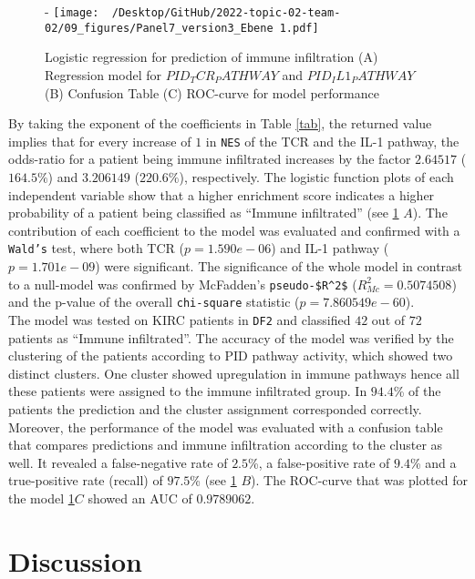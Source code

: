 \documentclass[
  parskip,
  oneside]{scrreprt}
\begin{document}
\begin{figure}[h]-
  \texttt{[image: ~/Desktop/GitHub/2022-topic-02-team-02/09\_figures/Panel7\_version3\_Ebene 1.pdf]}
  \caption{Logistic regression for prediction of immune infiltration (A) Regression model for $PID_TCR_PATHWAY$ and $PID_IL1_PATHWAY$ (B) Confusion Table (C) ROC-curve for model performance}
  \label{log}
\end{figure}

By taking the exponent of the coefficients in Table \cref{tab}, the
returned value implies that for every increase of \(1\) in \texttt{NES}
of the TCR and the IL-1 pathway, the odds-ratio for a patient being
immune infiltrated increases by the factor \(2.64517\) (\(164.5\%\)) and
\(3.206149\) (\(220.6\%\)), respectively. The logistic function plots of
each independent variable show that a higher enrichment score indicates
a higher probability of a patient being classified as ``Immune
infiltrated'' (see \cref{log} \(A\)). The contribution of each
coefficient to the model was evaluated and confirmed with a
\texttt{Wald’s} test, where both TCR (\(p= 1.590e-06\)) and IL-1 pathway
(\(p= 1.701e-09\)) were significant. The significance of the whole model
in contrast to a null-model was confirmed by McFadden's
\texttt{pseudo-\$R\^{}2\$} (\(R_{Mc}^2=0.5074508\)) and the p-value of
the overall \texttt{chi-square} statistic (\(p=7.860549e-60\)).\\
The model was tested on KIRC patients in \texttt{DF2} and classified
\(42\) out of \(72\) patients as ``Immune infiltrated''. The accuracy of
the model was verified by the clustering of the patients according to
PID pathway activity, which showed two distinct clusters. One cluster
showed upregulation in immune pathways hence all these patients were
assigned to the immune infiltrated group. In \(94.4\)\% of the patients
the prediction and the cluster assignment corresponded correctly.
Moreover, the performance of the model was evaluated with a confusion
table that compares predictions and immune infiltration according to the
cluster as well. It revealed a false-negative rate of \(2.5\)\%, a
false-positive rate of \(9.4\)\% and a true-positive rate (recall) of
\(97.5\)\% (see \cref{log} \(B\)). The ROC-curve that was plotted for
the model \cref{log}\(C\) showed an AUC of \(0.9789062\).

\hypertarget{discussion}{%
\chapter{Discussion}\label{discussion}}
\end{document}
